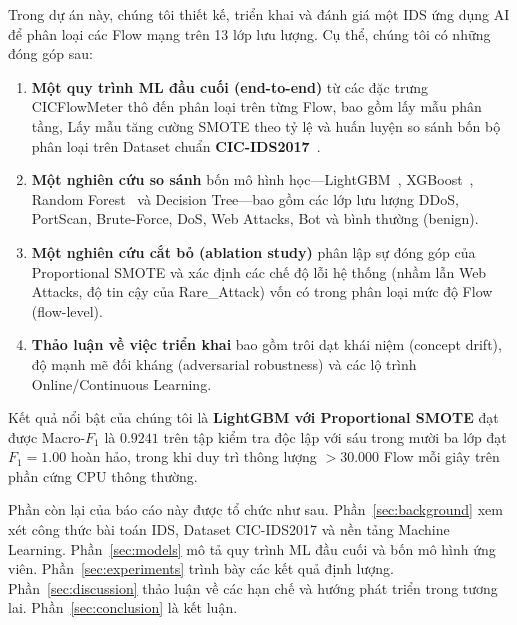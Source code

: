Trong dự án này, chúng tôi thiết kế, triển khai và đánh giá một IDS ứng dụng AI để phân loại các Flow mạng trên 13 lớp lưu lượng. Cụ thể, chúng tôi có những đóng góp sau:
\begin{enumerate}
    \item \textbf{Một quy trình ML đầu cuối (end-to-end)} từ các đặc trưng CICFlowMeter thô đến phân loại trên từng Flow, bao gồm lấy mẫu phân tầng, Lấy mẫu tăng cường SMOTE theo tỷ lệ và huấn luyện so sánh bốn bộ phân loại trên Dataset chuẩn \textbf{CIC-IDS2017}~\cite{ref_cicids2017}.
    \item \textbf{Một nghiên cứu so sánh} bốn mô hình học---LightGBM~\cite{ref_lightgbm}, XGBoost~\cite{ref_xgboost}, Random Forest~\cite{ref_rf} và Decision Tree---bao gồm các lớp lưu lượng DDoS, PortScan, Brute-Force, DoS, Web Attacks, Bot và bình thường (benign).
    \item \textbf{Một nghiên cứu cắt bỏ (ablation study)} phân lập sự đóng góp của Proportional SMOTE và xác định các chế độ lỗi hệ thống (nhầm lẫn Web Attacks, độ tin cậy của Rare\_Attack) vốn có trong phân loại mức độ Flow (flow-level).
    \item \textbf{Thảo luận về việc triển khai} bao gồm trôi dạt khái niệm (concept drift), độ mạnh mẽ đối kháng (adversarial robustness) và các lộ trình Online/Continuous Learning.
\end{enumerate}

Kết quả nổi bật của chúng tôi là \textbf{LightGBM với Proportional SMOTE} đạt được Macro-$F_1$ là $0.9241$ trên tập kiểm tra độc lập với sáu trong mười ba lớp đạt $F_1 = 1.00$ hoàn hảo, trong khi duy trì thông lượng $> 30{.}000$ Flow mỗi giây trên phần cứng CPU thông thường.

Phần còn lại của báo cáo này được tổ chức như sau. Phần~\ref{sec:background} xem xét công thức bài toán IDS, Dataset CIC-IDS2017 và nền tảng Machine Learning. Phần~\ref{sec:models} mô tả quy trình ML đầu cuối và bốn mô hình ứng viên. Phần~\ref{sec:experiments} trình bày các kết quả định lượng. Phần~\ref{sec:discussion} thảo luận về các hạn chế và hướng phát triển trong tương lai. Phần~\ref{sec:conclusion} là kết luận.
